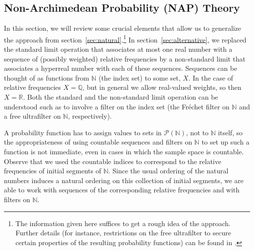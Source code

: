 \subsection{Non-Archimedean Probability (NAP) Theory}\label{sec:NAP}
In this section, we will review some crucial elements that allow us to generalize the approach from section~\ref{sec:natural}.\footnote{The information given here suffices to get a rough idea of the approach. Further details (for instance, restrictions on the free ultrafilter to secure certain properties of the resulting probability functions) can be found in \citet{Benci_etal:2013}.}
In section~\ref{sec:alternative}, we replaced the standard limit operation that associates at most one real number with a sequence of (possibly weighted) relative frequencies by a non-standard limit that associates a hyperreal number with each of these sequences.
Sequences can be thought of as functions from $\mathbb{N}$ (the index set) to some set, $X$. In the case of relative frequencies $X=\mathbb{Q}$, but in general we allow real-valued weights, so then $X=\mathbb{R}$.
Both the standard and the non-standard limit operation can be understood such as to involve a filter on the index set (the Fr\'{e}chet filter on $\mathbb{N}$ and a free ultrafilter on $\mathbb{N}$, respectively).

A probability function has to assign values to sets in $\mathcal{P}(\mathbb{N})$, not to $\mathbb{N}$ itself, so the appropriateness of using countable sequences and filters on $\mathbb{N}$ to set up such a function is not immediate, even in cases in which the sample space is countable. Observe that we used the countable indices to correspond to the relative frequencies of initial segments of $\mathbb{N}$. Since the usual ordering of the natural numbers induces a natural ordering on this collection of initial segments, we are able to work with sequences of the corresponding relative frequencies and with filters on $\mathbb{N}$.

